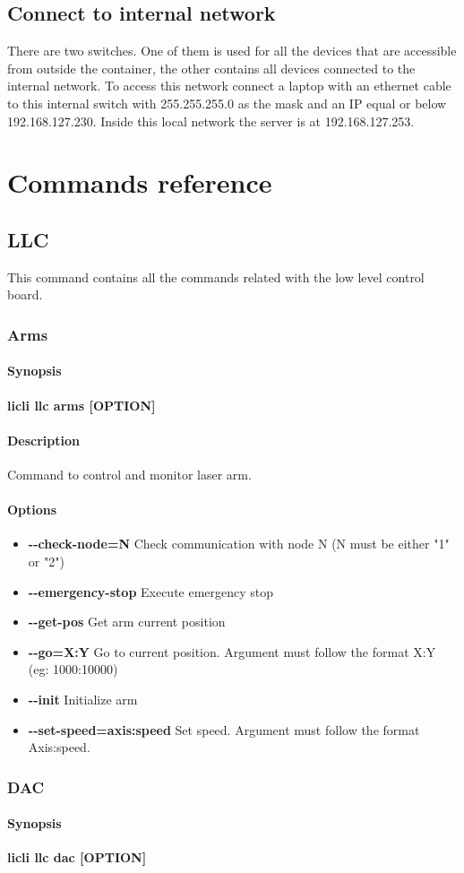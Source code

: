 \documentclass[letterpaper, 10 pt]{article}
\newcommand{\cmdsection}[1]{\paragraph{#1}\mbox{}\par}
\begin{document}
\subsection{Connect to internal network}
There are two switches. One of them is used for all the devices that are accessible from outside the container, the other contains all devices connected to the internal network. To access this network connect a laptop with an ethernet cable to this internal switch with 255.255.255.0 as the mask and an IP equal or below 192.168.127.230. Inside this local network the server is at 192.168.127.253.

\section{Commands reference}
\subsection{LLC}
This command contains all the commands related with the low level control board.
\subsubsection{Arms}
\cmdsection{Synopsis} \textbf{licli llc arms [OPTION]}\\

\cmdsection{Description} Command to control and monitor laser arm. \\
\cmdsection{Options}
\begin{itemize}
	\item[] \textbf{-{}-check-node=N} Check communication with node N (N must be either "1" or "2")
	\item[] \textbf{-{}-emergency-stop} Execute emergency stop
	\item[] \textbf{-{}-get-pos} Get arm current position
	\item[] \textbf{-{}-go=X:Y} Go to current position. Argument must follow the format X:Y (eg: 1000:10000)
	\item[] \textbf{-{}-init} Initialize arm
	\item[] \textbf{-{}-set-speed=axis:speed} Set speed. Argument must follow the format Axis:speed.
\end{itemize}
\subsubsection{DAC}
\addtolength{\leftskip}{10 mm}
\cmdsection{Synopsis} \textbf{licli llc dac [OPTION] \\}
\end{document}
